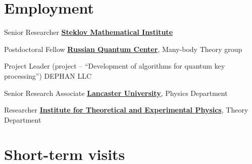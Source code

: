\documentclass[10pt,a4paper,sans]{moderncv}
\begin{document}
\section{Employment}

	{Senior Researcher}{}
	{\textbf{\textcolor{blue}{\href{http://www.mi.ras.ru/index.php?c=&l=1}{Steklov Mathematical Institute}}}}{}{}


	{Postdoctoral Fellow}{}
	{\textbf{\textcolor{blue}{\href{http://rqc.ru}{Russian Quantum Center}}},  Many-body Theory group}{}{}

	{Project Leader (project -- ``Development of algorithms for quantum key processing'')}{}
	{DEPHAN LLC}{}{}

	{Senior Research Associate}{}
	{\textbf{\textcolor{blue}{\href{http://www.lancaster.ac.uk}{Lancaster University}}},  Physics Department}{}{}

	{Researcher}{}
	{\textbf{\textcolor{blue}{\href{http://www.itep.ru/}{Institute for Theoretical and Experimental Physics}}},  Theory Department}{}{}

\section{Short-term visits}







	
\end{document}
